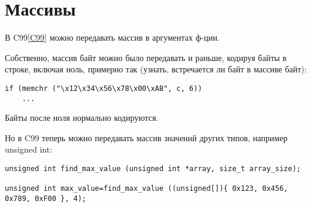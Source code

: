 ﻿\section{Массивы}

В C99\ref{C99} можно передавать массив в аргументах ф-ции.

Собственно, массив байт можно было передавать и раньше, кодируя байты в строке, включая ноль, примерно так
(узнать, встречается ли байт  в массиве байт):

\begin{lstlisting}
if (memchr ("\x12\x34\x56\x78\x00\xAB", c, 6))
	...
\end{lstlisting}

Байты после ноля нормально кодируются.

Но в C99 теперь можно передавать массив значений других типов, например unsigned int:

\begin{lstlisting}
unsigned int find_max_value (unsigned int *array, size_t array_size);

unsigned int max_value=find_max_value ((unsigned[]){ 0x123, 0x456, 0x789, 0xF00 }, 4);
\end{lstlisting}


